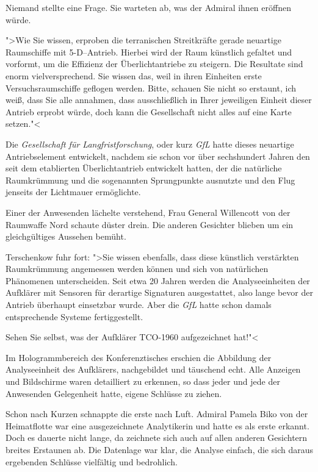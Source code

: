 Niemand stellte eine Frage. Sie warteten ab, was der Admiral ihnen eröffnen würde.

">Wie Sie wissen, erproben die terranischen Streitkräfte gerade neuartige Raumschiffe mit 5-D--Antrieb. Hierbei wird der Raum künstlich gefaltet und vorformt, um die Effizienz der Überlichtantriebe zu steigern. Die Resultate sind enorm vielversprechend. Sie wissen das, weil in ihren Einheiten erste Versuchsraumschiffe geflogen werden. Bitte, schauen Sie nicht so erstaunt, ich weiß, dass Sie alle annahmen, dass ausschließlich in Ihrer jeweiligen Einheit dieser Antrieb erprobt würde, doch kann die Gesellschaft nicht alles auf eine Karte setzen."<

Die \emph{Gesellschaft für Langfristforschung}, oder kurz \emph{GfL} hatte dieses neuartige Antriebselement entwickelt, nachdem sie schon vor über sechshundert Jahren den seit dem etablierten Überlichtantrieb entwickelt hatten, der die natürliche Raumkrümmung und die sogenannten Sprungpunkte ausnutzte und den Flug jenseits der Lichtmauer ermöglichte.

Einer der Anwesenden lächelte verstehend, Frau General Willencott von der Raumwaffe Nord schaute düster drein. Die anderen Gesichter blieben um ein gleichgültiges Aussehen bemüht.

Terschenkow fuhr fort: ">Sie wissen ebenfalls, dass diese künstlich verstärkten Raumkrümmung angemessen werden können und sich von natürlichen Phänomenen unterscheiden. Seit etwa 20 Jahren werden die Analyseeinheiten der Aufklärer mit Sensoren für derartige Signaturen ausgestattet, also lange bevor der Antrieb überhaupt einsetzbar wurde. Aber die \emph{GfL} hatte schon damals entsprechende Systeme fertiggestellt.

Sehen Sie selbst, was der Aufklärer \textsf{TCO-1960} aufgezeichnet hat!"<

Im Hologrammbereich des Konferenztisches erschien die Abbildung der Analyseeinheit des Aufklärers, nachgebildet und täuschend echt. Alle Anzeigen und Bildschirme waren detailliert zu erkennen, so dass jeder und jede der Anwesenden Gelegenheit hatte, eigene Schlüsse zu ziehen.

Schon nach Kurzen schnappte die erste nach Luft. Admiral Pamela Biko von der Heimatflotte war eine ausgezeichnete Analytikerin und hatte es als erste erkannt. Doch es dauerte nicht lange, da zeichnete sich auch auf allen anderen Gesichtern breites Erstaunen ab. Die Datenlage war klar, die Analyse einfach, die sich daraus ergebenden Schlüsse vielfältig und bedrohlich.

